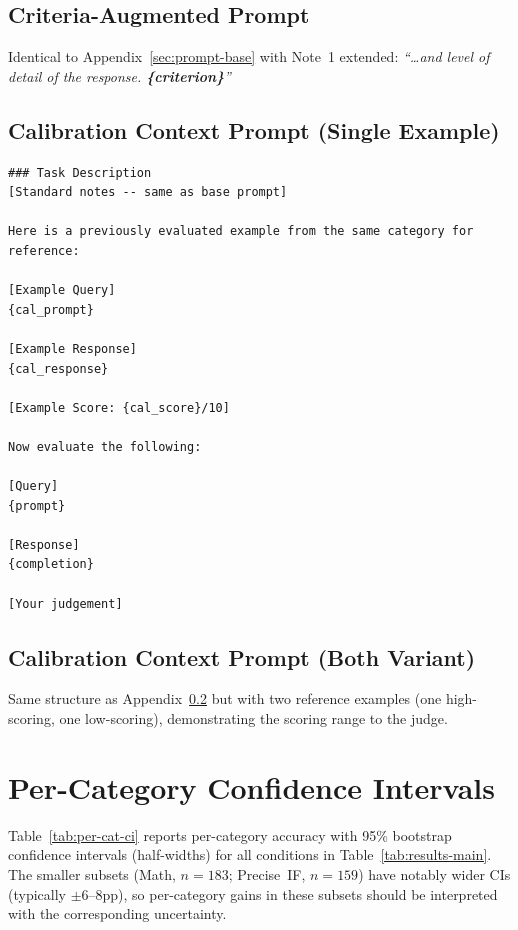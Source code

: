 \documentclass{article}
\begin{document}
\subsection{Criteria-Augmented Prompt}
\label{sec:prompt-criteria}

Identical to Appendix~\ref{sec:prompt-base} with Note~1 extended: \emph{``\ldots and level of detail of the response. \textbf{\{criterion\}}''}

\subsection{Calibration Context Prompt (Single Example)}
\label{sec:prompt-cal-single}

\begin{lstlisting}[style=prompt]
### Task Description
[Standard notes -- same as base prompt]

Here is a previously evaluated example from the same category for reference:

[Example Query]
{cal_prompt}

[Example Response]
{cal_response}

[Example Score: {cal_score}/10]

Now evaluate the following:

[Query]
{prompt}

[Response]
{completion}

[Your judgement]
\end{lstlisting}

\subsection{Calibration Context Prompt (Both Variant)}
\label{sec:prompt-cal-both}

Same structure as Appendix~\ref{sec:prompt-cal-single} but with two reference examples (one high-scoring, one low-scoring), demonstrating the scoring range to the judge.

\section{Per-Category Confidence Intervals}
\label{sec:per-cat-ci}

Table~\ref{tab:per-cat-ci} reports per-category accuracy with 95\% bootstrap confidence intervals (half-widths) for all conditions in Table~\ref{tab:results-main}. The smaller subsets (Math, $n{=}183$; Precise~IF, $n{=}159$) have notably wider CIs (typically $\pm$6--8pp), so per-category gains in these subsets should be interpreted with the corresponding uncertainty.
\end{document}
